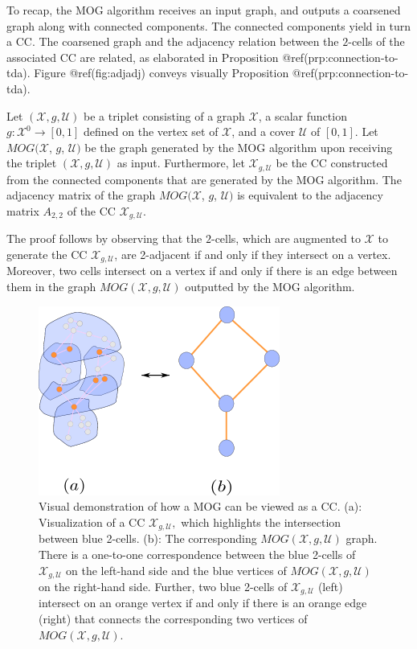 \documentclass[
  12pt,
]{krantz}
\begin{document}
To recap, the MOG algorithm receives an input graph, and outputs a
coarsened graph along with connected components. The connected
components yield in turn a CC. The coarsened graph and the adjacency
relation between the \(2\)-cells of the associated CC are related, as
elaborated in Proposition @ref(prp:connection-to-tda). Figure
@ref(fig:adjadj) conveys visually Proposition
@ref(prp:connection-to-tda).

\label{connection-to-tda}
Let \((\mathcal{X}, g, \mathcal{U})\) be a triplet consisting of a graph
\(\mathcal{X}\), a scalar function \(g\colon\mathcal{X}^0\to [0,1]\)
defined on the vertex set of \(\mathcal{X}\), and a cover
\(\mathcal{U}\) of \([0,1]\). Let \(MOG(\mathcal{X}\), \(g\),
\(\mathcal{U})\) be the graph generated by the MOG algorithm upon
receiving the triplet \((\mathcal{X}, g, \mathcal{U})\) as input.
Furthermore, let \(\mathcal{X}_{g,\mathcal{U}}\) be the CC constructed
from the connected components that are generated by the MOG algorithm.
The adjacency matrix of the graph \(MOG(\mathcal{X}\), \(g\),
\(\mathcal{U})\) is equivalent to the adjacency matrix \(A_{2,2}\) of
the CC \(\mathcal{X}_{g,\mathcal{U}}\).

The proof follows by observing that the \(2\)-cells, which are augmented
to \(\mathcal{X}\) to generate the CC \(\mathcal{X}_{g,\mathcal{U}}\),
are 2-adjacent if and only if they intersect on a vertex. Moreover, two
cells intersect on a vertex if and only if there is an edge between them
in the graph \(MOG(\mathcal{X}, g, \mathcal{U})\) outputted by the MOG
algorithm.

\begin{figure}

{\centering \includegraphics{figures/adjmog_adjcc_scaled} 

}

\caption{Visual demonstration of how a MOG can be viewed as a CC. (a): Visualization of a CC $\mathcal{X}_{g,\mathcal{U}},$ which highlights the intersection between blue 2-cells. (b): The corresponding $MOG(\mathcal{X}, g, \mathcal{U})$ graph. There is a one-to-one correspondence between the blue 2-cells of $\mathcal{X}_{g,\mathcal{U}}$ on the left-hand side and the blue vertices of $MOG(\mathcal{X}, g, \mathcal{U})$ on the right-hand side. Further, two blue 2-cells of $\mathcal{X}_{g,\mathcal{U}}$ (left) intersect on an orange vertex if and only if there is an orange edge (right) that connects the corresponding two vertices of $MOG(\mathcal{X}, g, \mathcal{U})$.}\label{fig:adjadj}
\end{figure}
\end{document}
